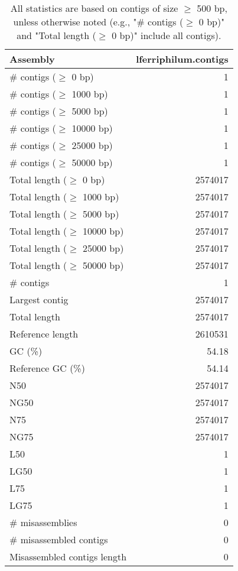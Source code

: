 \documentclass[12pt,a4paper]{article}
\begin{document}
\begin{table}[ht]
\begin{center}
\caption{All statistics are based on contigs of size $\geq$ 500 bp, unless otherwise noted (e.g., "\# contigs ($\geq$ 0 bp)" and "Total length ($\geq$ 0 bp)" include all contigs).}
\begin{tabular}{|l*{1}{|r}|}
\hline
Assembly & lferriphilum.contigs \\ \hline
\# contigs ($\geq$ 0 bp) & 1 \\ \hline
\# contigs ($\geq$ 1000 bp) & 1 \\ \hline
\# contigs ($\geq$ 5000 bp) & 1 \\ \hline
\# contigs ($\geq$ 10000 bp) & 1 \\ \hline
\# contigs ($\geq$ 25000 bp) & 1 \\ \hline
\# contigs ($\geq$ 50000 bp) & 1 \\ \hline
Total length ($\geq$ 0 bp) & 2574017 \\ \hline
Total length ($\geq$ 1000 bp) & 2574017 \\ \hline
Total length ($\geq$ 5000 bp) & 2574017 \\ \hline
Total length ($\geq$ 10000 bp) & 2574017 \\ \hline
Total length ($\geq$ 25000 bp) & 2574017 \\ \hline
Total length ($\geq$ 50000 bp) & 2574017 \\ \hline
\# contigs & 1 \\ \hline
Largest contig & 2574017 \\ \hline
Total length & 2574017 \\ \hline
Reference length & 2610531 \\ \hline
GC (\%) & 54.18 \\ \hline
Reference GC (\%) & 54.14 \\ \hline
N50 & 2574017 \\ \hline
NG50 & 2574017 \\ \hline
N75 & 2574017 \\ \hline
NG75 & 2574017 \\ \hline
L50 & 1 \\ \hline
LG50 & 1 \\ \hline
L75 & 1 \\ \hline
LG75 & 1 \\ \hline
\# misassemblies & 0 \\ \hline
\# misassembled contigs & 0 \\ \hline
Misassembled contigs length & 0 \\ \hline

\end{tabular}
\end{center}
\end{table}
\end{document}
